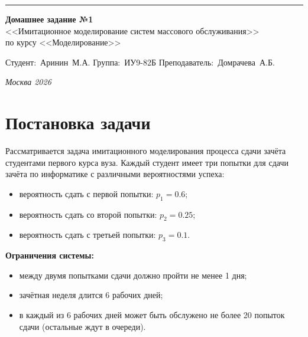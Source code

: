 \documentclass[a4paper, 14pt]{extarticle}
\begin{document}
\begin{titlepage}
\vspace*{-16pt}
\hspace{30pt}\rule{0.866\textwidth}{0.4pt}

\vspace{11em}

\begin{center}
\Large {\bf Домашнее задание №1} \\ 
\large <<Имитационное моделирование систем массового обслуживания>> \\
\large {по курсу <<Моделирование>>} \\

\end{center}\normalsize

\vspace{8em}

\vbox{%
\hfill%
\vbox{%
\hbox{Студент: Аринин М.А.}%
\hbox{Группа: ИУ9-82Б}%
\hbox{Преподаватель: Домрачева А.Б.}%
}%
} 

\bigskip

\vfill


\begin{center}
\textsl{Москва 2026}
\end{center}
\end{titlepage}



\setlength{\tabcolsep}{3pt}

\newpage
\setcounter{page}{2}

\section{Постановка задачи}
Рассматривается задача имитационного моделирования процесса сдачи зачёта студентами первого курса вуза. Каждый студент имеет три попытки для сдачи зачёта по информатике с различными вероятностями успеха:
\begin{itemize}
  \item вероятность сдать с первой попытки: $p_1 = 0.6$;
  \item вероятность сдать со второй попытки: $p_2 = 0.25$;
  \item вероятность сдать с третьей попытки: $p_3 = 0.1$.
\end{itemize}

\textbf{Ограничения системы:}
\begin{itemize}
  \item между двумя попытками сдачи должно пройти не менее 1 дня;
  \item зачётная неделя длится 6 рабочих дней;
  \item в каждый из 6 рабочих дней может быть обслужено не более 20 попыток сдачи (остальные ждут в очереди).
\end{itemize}
\end{document}
